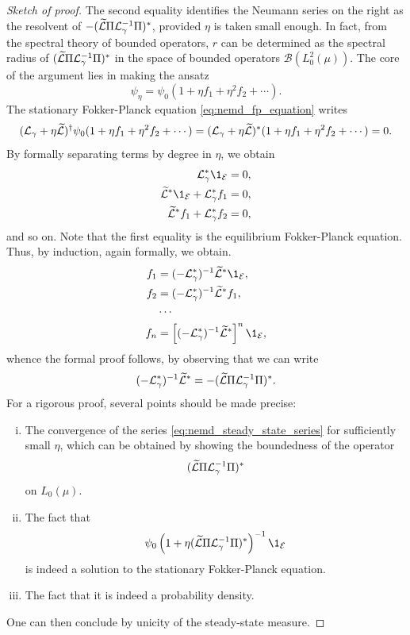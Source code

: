 \begin{proof}[Sketch of proof]
    The second equality identifies the Neumann series on the right as the resolvent of $-(\widetilde{\mathcal{L}} \Pi \mathcal{L}_\gamma^{-1}\Pi)^*$, provided $\eta$ is taken small enough.
    In fact, from the spectral theory of bounded operators, $r$ can be determined as the spectral radius of $(\widetilde{\mathcal{L}} \Pi \mathcal{L}_\gamma^{-1}\Pi)^*$ in the space of bounded operators $\mathcal{B}(L^2_0(\mu))$.
    The core of the argument lies in making the ansatz
    \begin{equation}
        \label{eq:nemd_measure_ansatz}
        \psi_\eta=\psi_0(1+\eta f_1+\eta^2 f_2+\dotsm).
    \end{equation}
    The stationary Fokker-Planck equation \eqref{eq:nemd_fp_equation} writes
    \[(\mathcal{L}_\gamma +\eta \widetilde{\mathcal{L}})^{\dagger}\psi_0(1+\eta f_1+\eta^2 f_2+\dotsm)=(\mathcal{L}_\gamma +\eta \widetilde{\mathcal{L}})^{*}(1+\eta f_1+\eta^2 f_2+\dotsm)=0.\]
    By formally separating terms by degree in $\eta$, we obtain
    \begin{align*}
        \cL_\gamma^* \1_\mathcal E&=0,\\
        \widetilde{\cL}^*\1_{\mathcal E}+\cL_\gamma^*f_1&=0,\\
        \widetilde{\cL}^*f_1+\cL_\gamma^*f_2&=0,
    \end{align*}
    and so on. Note that the first equality is the equilibrium Fokker-Planck equation.
    Thus, by induction, again formally, we obtain.
    \begin{align*}
        f_1 &= (-\cL_\gamma^*)^{-1}\widetilde{\cL}^*\1_{\mathcal E},\\
        f_2 &= (-\cL_\gamma^*)^{-1}\widetilde{\cL}^*f_1,\\
        &\dotsm\\
        f_n &= \left[(-\cL_\gamma^*)^{-1}\widetilde{\cL}^*\right]^{n}\1_{\mathcal E},
    \end{align*}
    whence the formal proof follows, by observing that we can write 
    \[(-\mathcal{L}_\gamma^*)^{-1}\widetilde{\mathcal{L}}^*=-(\widetilde{\mathcal{L}} \Pi \mathcal{L}_\gamma^{-1}\Pi)^*.\]
    For a rigorous proof, several points should be made precise:
    \begin{enumerate}[(i)]
        \item The convergence of the series \eqref{eq:nemd_steady_state_series} for sufficiently small $\eta$, which can be obtained by showing the boundedness of the operator \[(\widetilde{\mathcal{L}} \Pi \mathcal{L}_\gamma^{-1}\Pi)^*\] on $L_0(\mu)$.
        \item The fact that \[\psi_0\left(1+\eta(\widetilde{\cL} \Pi \cL_\gamma^{-1}\Pi)^*\right)^{-1}\1_{\mathcal E}\] is indeed a solution to the stationary Fokker-Planck equation.
        \item The fact that it is indeed a probability density. 
    \end{enumerate}
    One can then conclude by unicity of the steady-state measure.
\end{proof}
